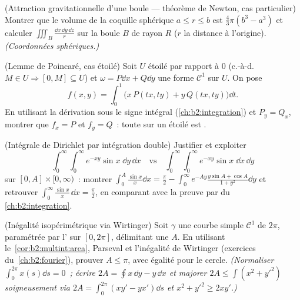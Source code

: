 \begin{exercise}[$\star\star$]\label{exo:b2:multint:7}
(Attraction gravitationnelle d'une boule --- théorème de Newton, cas
particulier) Montrer que le volume de la coquille sphérique $a \leq r \leq
b$ est $\frac43\pi(b^3 - a^3)$ et calculer $\iiint_{B}
\frac{\dd x\,\dd y\,\dd z}{r}$ sur la boule $B$ de rayon $R$
($r$ la distance à l'origine). \emph{(Coordonnées
sphériques.)}
\end{exercise}

\begin{exercise}[$\star\star\star$]\label{exo:b2:multint:8}
(Lemme de Poincaré, cas étoilé) Soit $U$ étoilé par rapport
à $0$ (c.-à-d.\ $M \in U \Rightarrow [0, M] \subseteq U$)
et $\omega = P\dd x + Q\dd y$ une forme $\mathcal{C}^1$  sur
$U$. On pose
\[
f(x, y) = \int_0^1 \bigl(x\,P(tx, ty) + y\,Q(tx, ty)\bigr)\dd t .
\]
En utilisant la dérivation sous le signe intégral
(\cref{ch:b2:integration}) et $P_y = Q_x$, montrer que $f_x = P$
et $f_y = Q$~: toute  sur un  étoilé est
.
\end{exercise}

\begin{exercise}[$\star\star\star$]\label{exo:b2:multint:9}
(Intégrale de Dirichlet par intégration double) Justifier et exploiter
\[
\int_0^\infty\!\!\int_0^\infty e^{-xy}\sin x\;\dd y\,\dd x
\quad\text{vs}\quad
\int_0^\infty\!\!\int_0^\infty e^{-xy}\sin x\;\dd x\,\dd y
\]
sur $[0, A] \times [0, \infty)$~: montrer $\int_0^A \frac{\sin
x}{x}\dd x = \frac\pi2 - \int_0^\infty
e^{-Ay}\frac{y\sin A + \cos A}{1 + y^2}\dd y$ et retrouver
$\int_0^\infty \frac{\sin x}{x}\,\dd x = \frac\pi2$, en comparant
avec la preuve par  du~%
\cref{ch:b2:integration}.
\end{exercise}

\begin{exercise}[$\star\star\star$]\label{exo:b2:multint:10}
(Inégalité isopérimétrique via Wirtinger) Soit $\gamma$ une courbe
 simple $\mathcal{C}^1$ de  $2\pi$, paramétrée par
l' sur $[0, 2\pi]$, délimitant une  $A$. En
utilisant le~\cref{cor:b2:multint:area}, Parseval et l'inégalité de
Wirtinger (exercices du~\cref{ch:b2:fourier}), prouver $A \leq \pi$, avec
égalité pour le cercle. \emph{(Normaliser $\int_0^{2\pi} x(s)\dd s
= 0$~; écrire $2A = \oint x\,\dd y - y\,\dd x$ et majorer $2A \leq
\int (x^2 + y'^2)$ soigneusement via $2A = \int_0^{2\pi}(xy' - yx')\dd
s$ et $x^2 + y'^2 \geq 2xy'$.)}
\end{exercise}

